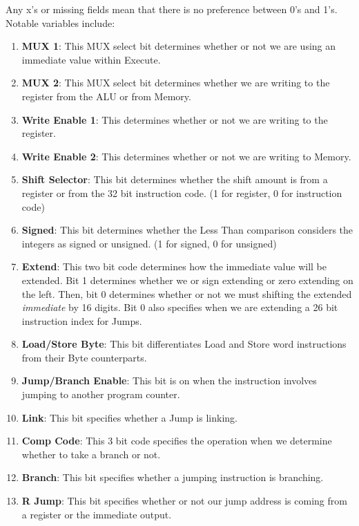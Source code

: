 \documentclass{article}
\begin{document}
\normalsize
Any x's or missing fields mean that there is no preference between 0's and 1's. Notable variables include:
\begin{enumerate}
\item
\textbf{MUX 1}: This MUX select bit determines whether or not we are using an immediate value within Execute.

\item
\textbf{MUX 2}: This MUX select bit determines whether we are writing to the register from the ALU or from Memory.

\item
\textbf{Write Enable 1}: This determines whether or not we are writing to the register.

\item
\textbf{Write Enable 2}: This determines whether or not we are writing to Memory.

\item
\textbf{Shift Selector}: This bit determines whether the shift amount is from a register or from the 32 bit instruction code. (1 for register, 0 for instruction code)

\item
\textbf{Signed}: This bit determines whether the Less Than comparison considers the integers as signed or unsigned. (1 for signed, 0 for unsigned)

\item
\textbf{Extend}: This two bit code determines how the immediate value will be extended. Bit 1 determines whether we or sign extending or zero extending on the left. Then, bit 0 determines whether or not we must shifting the extended \textit{immediate} by 16 digits. Bit 0 also specifies when we are extending a 26 bit instruction index for Jumps.

\item
\textbf{Load/Store Byte}: This bit differentiates Load and Store word instructions from their Byte counterparts.

\item
\textbf{Jump/Branch Enable}: This bit is on when the instruction involves jumping to another program counter.

\item
\textbf{Link}: This bit specifies whether a Jump is linking. 

\item
\textbf{Comp Code}: This 3 bit code specifies the operation when we determine whether to take a branch or not.

\item
\textbf{Branch}: This bit specifies whether a jumping instruction is branching.

\item
\textbf{R Jump}: This bit specifies whether or not our jump address is coming from a register or the immediate output. 

\end{enumerate}
\end{document}
